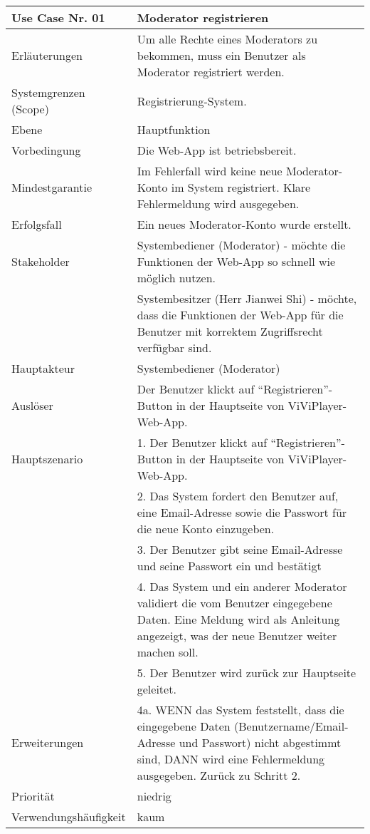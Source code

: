\begin{tabularx}{\linewidth}{|l|X|}
	\hline
	Use Case Nr. 01			& \textbf{Moderator registrieren} \\ \hline
	Erläuterungen			& Um alle Rechte eines Moderators zu bekommen, muss ein 
							Benutzer als Moderator registriert werden. \\ \hline
	Systemgrenzen (Scope)	& Registrierung-System. \\ \hline
	Ebene					& Hauptfunktion \\ \hline
	Vorbedingung			& Die Web-App ist betriebsbereit. \\ \hline
	Mindestgarantie			& Im Fehlerfall wird keine neue Moderator-Konto im System 
	                          registriert. Klare Fehlermeldung wird ausgegeben. \\ \hline
	Erfolgsfall  			& Ein neues Moderator-Konto wurde erstellt. \\ \hline
	Stakeholder				& Systembediener (Moderator) - möchte die Funktionen der Web-App so 
							  schnell wie möglich nutzen. \\
							& Systembesitzer (Herr Jianwei Shi) - möchte, dass die Funktionen 
							  der Web-App für die Benutzer mit korrektem Zugriffsrecht verfügbar sind.\\ \hline
	Hauptakteur				& Systembediener (Moderator) \\ \hline
	Auslöser				& Der Benutzer klickt auf ``Registrieren''-Button in der 
							  Hauptseite von ViViPlayer-Web-App. \\ \hline	
	Hauptszenario			& 1. Der Benutzer klickt auf ``Registrieren''-Button in der 
							  Hauptseite von ViViPlayer-Web-App. \\
							& 2. Das System fordert den Benutzer auf, eine Email-Adresse 
							  sowie die Passwort für die neue Konto einzugeben. \\
							& 3. Der Benutzer gibt seine Email-Adresse und seine Passwort 
							  ein und bestätigt \\
							& 4. Das System und ein anderer Moderator validiert die vom 
							  Benutzer eingegebene Daten. Eine Meldung wird als 
							  Anleitung angezeigt, was der neue Benutzer weiter machen soll. \\
							& 5. Der Benutzer wird zurück zur Hauptseite geleitet. 
							  \\ \hline
	Erweiterungen			& 4a. WENN das System feststellt, dass die eingegebene Daten 
							  (Benutzername/Email-Adresse und Passwort) nicht abgestimmt sind, DANN wird eine Fehlermeldung ausgegeben. Zurück zu Schritt 2. \\ \hline
	Priorität				& niedrig \\ \hline
	Verwendungshäufigkeit	& kaum \\ \hline
\end{tabularx}

